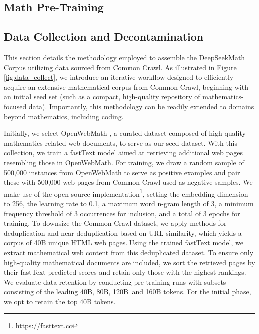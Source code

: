 \begin{itemize}[topsep=0pt]
\section{Math Pre-Training}

\subsection{Data Collection and Decontamination} This section details the methodology employed to assemble the DeepSeekMath Corpus utilizing data sourced from Common Crawl. As illustrated in Figure \ref{fig:data_collect}, we introduce an iterative workflow designed to efficiently acquire an extensive mathematical corpus from Common Crawl, beginning with an initial seed set (such as a compact, high-quality repository of mathematics-focused data). Importantly, this methodology can be readily extended to domains beyond mathematics, including coding.

Initially, we select OpenWebMath \citep{openwebmath}, a curated dataset composed of high-quality mathematics-related web documents, to serve as our seed dataset. With this collection, we train a fastText model \citep{joulin2016fasttext} aimed at retrieving additional web pages resembling those in OpenWebMath. For training, we draw a random sample of 500,000 instances from OpenWebMath to serve as positive examples and pair these with 500,000 web pages from Common Crawl used as negative samples. We make use of the open-source implementation\footnote{\url{https://fasttext.cc}}, setting the embedding dimension to 256, the learning rate to 0.1, a maximum word n-gram length of 3, a minimum frequency threshold of 3 occurrences for inclusion, and a total of 3 epochs for training. To downsize the Common Crawl dataset, we apply methods for deduplication and near-deduplication based on URL similarity, which yields a corpus of 40B unique HTML web pages. Using the trained fastText model, we extract mathematical web content from this deduplicated dataset. To ensure only high-quality mathematical documents are included, we sort the retrieved pages by their fastText-predicted scores and retain only those with the highest rankings. We evaluate data retention by conducting pre-training runs with subsets consisting of the leading 40B, 80B, 120B, and 160B tokens. For the initial phase, we opt to retain the top 40B tokens.


\end{itemize}
